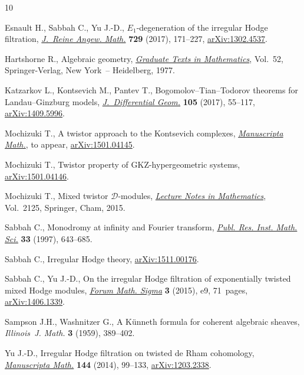 \documentclass[pdftex]{sigma}
\begin{document}
\begin{thebibliography}{10}
\footnotesize\itemsep=0pt

Esnault H., Sabbah C., Yu J.-D., {$E_1$}-degeneration of the irregular {H}odge
 filtration, \href{https://doi.org/10.1515/crelle-2014-0118}{\textit{J.~Reine Angew. Math.}} \textbf{729} (2017), 171--227,
 \href{https://arxiv.org/abs/1302.4537}{arXiv:1302.4537}.

Hartshorne R., Algebraic geometry, \href{https://doi.org/10.1007/978-1-4757-3849-0}{\textit{Graduate Texts in Mathematics}}, Vol.~52, Springer-Verlag, New York~--
 Heidelberg, 1977.

Katzarkov L., Kontsevich M., Pantev T., Bogomolov--{T}ian--{T}odorov theorems
 for {L}andau--{G}inzburg models, \href{https://doi.org/10.4310/jdg/1483655860}{\textit{J.~Differential Geom.}} \textbf{105}
 (2017), 55--117, \href{https://arxiv.org/abs/1409.5996}{arXiv:1409.5996}.

Mochizuki T., A twistor approach to the {K}ontsevich complexes,
 \href{https://doi.org/10.1007/s00229-017-0989-5}{\textit{Manuscripta Math.}}, {t}o appear, \href{https://arxiv.org/abs/1501.04145}{arXiv:1501.04145}.

Mochizuki T., Twistor property of {GKZ}-hypergeometric systems,
 \href{https://arxiv.org/abs/1501.04146}{arXiv:1501.04146}.

Mochizuki T., Mixed twistor {$\mathcal D$}-modules, \href{https://doi.org/10.1007/978-3-319-10088-3}{\textit{Lecture Notes in
 Mathematics}}, Vol.~2125, Springer, Cham, 2015.

Sabbah C., Monodromy at infinity and {F}ourier transform, \href{https://doi.org/10.2977/prims/1195145150}{\textit{Publ. Res.
 Inst. Math. Sci.}} \textbf{33} (1997), 643--685.

Sabbah C., Irregular {H}odge theory, \href{https://arxiv.org/abs/1511.00176}{arXiv:1511.00176}.

Sabbah C., Yu J.-D., On the irregular {H}odge filtration of exponentially
 twisted mixed {H}odge modules, \href{https://doi.org/10.1017/fms.2015.8}{\textit{Forum Math. Sigma}} \textbf{3} (2015),
 e9, 71~pages, \href{https://arxiv.org/abs/1406.1339}{arXiv:1406.1339}.

Sampson J.H., Washnitzer G., A {K}\"unneth formula for coherent algebraic
 sheaves, \textit{Illinois~J. Math.} \textbf{3} (1959), 389--402.

Yu J.-D., Irregular {H}odge filtration on twisted de {R}ham cohomology,
 \href{https://doi.org/10.1007/s00229-013-0642-x}{\textit{Manuscripta Math.}} \textbf{144} (2014), 99--133, \href{https://arxiv.org/abs/1203.2338}{arXiv:1203.2338}.

\end{thebibliography}\LastPageEnding
\end{document}
